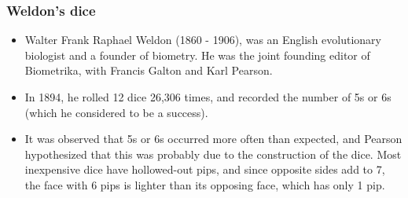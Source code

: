 \documentclass[slidestop,compress,mathserif]{beamer}
\begin{document}
\begin{frame}
\frametitle{Weldon's dice}

{
\begin{itemize}

\item Walter Frank Raphael Weldon (1860 - 1906), was an English evolutionary biologist and a founder of biometry. He was the joint founding editor of Biometrika, with Francis Galton and Karl Pearson.

\item In 1894, he rolled 12 dice 26,306 times, and recorded the number of 5s or 6s (which he considered to be a success).

\end{itemize}
}
{
\begin{center}
\end{center}
}
\begin{itemize}

\item It was observed that 5s or 6s occurred more often than expected, and Pearson hypothesized that this was probably due to the construction of the dice. Most inexpensive dice have hollowed-out pips, and since opposite sides add to 7, the face with 6 pips is lighter than its opposing face, which has only 1 pip.

\end{itemize}

\end{frame}

\end{document}

